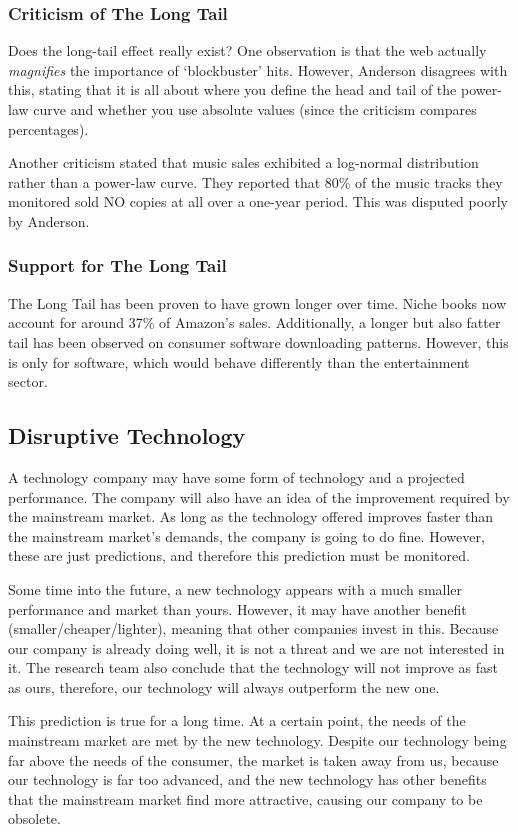 \documentclass[11pt,a4paper,titlepage,dvipsnames,cmyk]{scrartcl}
\begin{document}
\subsubsection{Criticism of The Long Tail}
Does the long-tail effect really exist? One observation is that the web actually \textit{magnifies} the importance of `blockbuster' hits. However, Anderson disagrees with this, stating that it is all about where you define the head and tail of the power-law curve and whether you use absolute values (since the criticism compares percentages).

Another criticism stated that music sales exhibited a log-normal distribution rather than a power-law curve. They reported that 80\% of the music tracks they monitored sold NO copies at all over a one-year period. This was disputed poorly by Anderson.

\subsubsection{Support for The Long Tail}
The Long Tail has been proven to have grown longer over time. Niche books now account for around 37\% of Amazon's sales. Additionally, a longer but also fatter tail has been observed on consumer software downloading patterns. However, this is only for software, which would behave differently than the entertainment sector.

\subsection{Disruptive Technology}
A technology company may have some form of technology and a projected performance. The company will also have an idea of the improvement required by the mainstream market. As long as the technology offered improves faster than the mainstream market's demands, the company is going to do fine. However, these are just predictions, and therefore this prediction must be monitored.

Some time into the future, a new technology appears with a much smaller performance and market than yours. However, it may have another benefit (smaller/cheaper/lighter), meaning that other companies invest in this. Because our company is already doing well, it is not a threat and we are not interested in it. The research team also conclude that the technology will not improve as fast as ours, therefore, our technology will always outperform the new one.

This prediction is true for a long time. At a certain point, the needs of the mainstream market are met by the new technology. Despite our technology being far above the needs of the consumer, the market is taken away from us, because our technology is far too advanced, and the new technology has other benefits that the mainstream market find more attractive, causing our company to be obsolete.
\end{document}
